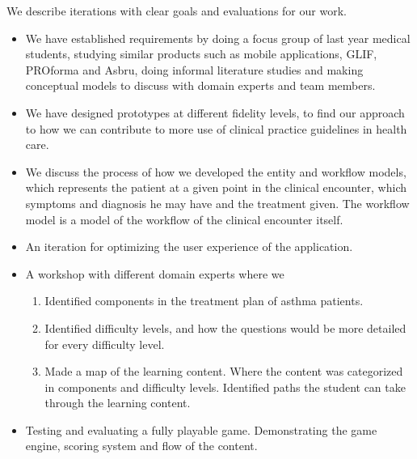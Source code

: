 We describe iterations with clear goals and evaluations for our work. 
\begin{itemize}
	\item We have established requirements by doing a focus group of last year medical students, studying similar products such as mobile applications, GLIF, PROforma and Asbru, doing informal literature studies and making conceptual models to discuss with domain experts and team members.
	\item We have designed prototypes at different fidelity levels, to find our approach to how we can contribute to more use of clinical practice guidelines in health care.
	\item We discuss the process of how we developed the entity and workflow models, which represents the patient at a given point in the clinical encounter, which symptoms and diagnosis he may have and the treatment given. The workflow model is a model of the workflow of the clinical encounter itself.
	\item An iteration for optimizing the user experience of the application. 
	\item A workshop with different domain experts where we
	\begin{enumerate}
		\item Identified components in the treatment plan of asthma patients.
		\item Identified difficulty levels, and how the questions would be more detailed for every difficulty level.
		\item Made a map of the learning content. Where the content was categorized in components and difficulty levels.  Identified paths the student can take through the learning content. 
	\end{enumerate}
	\item Testing and evaluating a fully playable game. Demonstrating the game engine, scoring system and flow of the content.
\end{itemize}



